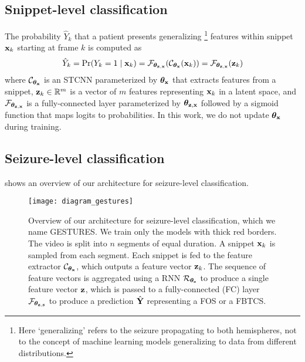 \subsection{Snippet-level classification}
\label{sec:snippet-level}

The probability $\hat{Y}_k$ that a patient presents generalizing%
\footnote{Here `generalizing' refers to the seizure propagating to both hemispheres, not to the concept of machine learning models generalizing to data from different distributions.}
features within snippet $\mathbf{x}_k$ starting at frame $k$ is computed as
\begin{equation}
    \hat{Y}_k = \Pr(Y_k = 1 \mid \mathbf{x}_k) = \mathcal{F}_{\bm{\theta}_{\mathbf{z},\mathbf{x}}}( \mathcal{C}_{\bm{\theta}_{\mathbf{x}}}(\mathbf{x}_k) ) = \mathcal{F}_{\bm{\theta}_{\mathbf{z},\mathbf{x}}}( \mathbf{z}_k)
\end{equation}
where
$\mathcal{C}_{\bm{\theta}_{\mathbf{x}}}$ is an \ac{STCNN} parameterized by $\bm{\theta}_{\mathbf{x}}$ that extracts features from a snippet,
$\mathbf{z}_k \in \mathbb{R} ^ m$ is a vector of $m$ features representing $\mathbf{x}_k$ in a latent space,
and
$\mathcal{F}_{\bm{\theta}_{\mathbf{z},\mathbf{x}}}$ is a fully-connected layer parameterized by $\bm{\theta}_{\mathbf{z},\mathbf{x}}$ followed by a sigmoid function that maps logits to probabilities.
In this work, we do not update $\bm{\theta}_{\mathbf{x}}$ during training.


\subsection{Seizure-level classification}
\label{sec:meth_seizure}

 shows an overview of our architecture for seizure-level classification.

\begin{figure}
  \centering
  \texttt{[image: diagram\_gestures]}
  \caption[Overview of the GESTURES architecture]{
    Overview of our architecture for seizure-level classification, which we name \acf*{GESTURES}.
    We train only the models with thick red borders.
    The video is split into $n$ segments of equal duration.
    A snippet $\mathbf{x}_k$ is sampled from each segment.
    Each snippet is fed to the feature extractor $\mathcal{C}_{\bm{\theta}_{\mathbf{x}}}$, which outputs a feature vector $\mathbf{z}_k$.
    The sequence of feature vectors is aggregated using a \acf*{RNN} $\mathcal{R}_{\bm{\theta}_{\mathbf{s}}}$ to produce a single feature vector $\mathbf{z}$, which is passed to a fully-connected (FC) layer $\mathcal{F}_{\bm{\theta}_{\mathbf{z},\mathbf{s}}}$ to produce a prediction $\hat{\mathbf{Y}}$ representing a \acf*{FOS} or a \acf*{FBTCS}.
  }
  \label{fig:gestures}
\end{figure}

